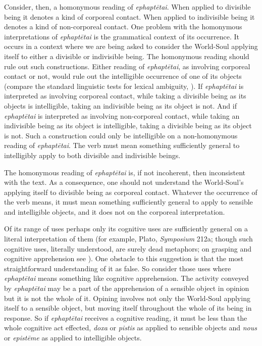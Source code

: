 Consider, then, a homonymous reading of \emph{ephaptētai}. When applied to divisible being it denotes a kind of corporeal contact. When applied to indivisible being it denotes a kind of non-corporeal contact. One problem with the homonymous interpretations of \emph{ephaptētai} is the grammatical context of its occurrence. It occurs in a context where we are being asked to consider the World-Soul applying itself to either a divisible or indivisible being. The homonymous reading should rule out such constructions. Either reading of \emph{ephaptētai}, as involving corporeal contact or not, would rule out the intelligible occurrence of one of its objects  (compare the standard linguistic tests for lexical ambiguity, \citealt{Zwicky:1975hl}). If \emph{ephaptētai} is interpreted as involving corporeal contact, while taking a divisible being as its objects is intelligible, taking an indivisible being as its object is not. And if \emph{ephaptētai} is interpreted as involving non-corporeal contact, while taking an indivisible being as its object is intelligible, taking a divisible being as its object is not. Such a construction could only be intelligible on a non-homonymous reading of \emph{ephaptētai}. The verb must mean something sufficiently general to intelligibly apply to both divisible and indivisible beings.

The homonymous reading of \emph{ephaptētai} is, if not incoherent, then inconsistent with the text. As a consequence, one should not understand the World-Soul's applying itself to divisible being as corporeal contact. Whatever the occurrence of the verb means, it must mean something sufficiently general to apply to sensible and intelligible objects, and it does not on the corporeal interpretation. 

Of its range of uses perhaps only its cognitive uses are sufficiently general on a literal interpretation of them (for example, Plato, \emph{Symposium} 212a; though such cognitive uses, literally understood, are surely dead metaphors; on grasping and cognitive apprehension see \citealt{Rosen:1961aa}). One obstacle to this suggestion is that the most straightforward understanding of it as false. So consider those uses where \emph{ephaptētai} means something like cognitive apprehension. The activity conveyed by \emph{ephaptētai} may be a part of the apprehension of a sensible object in opinion but it is not the whole of it. Opining involves not only the World-Soul applying itself to a sensible object, but moving itself throughout the whole of its being in response. So if \emph{ephaptētai} receives a cognitive reading, it must be less than the whole cognitive act effected, \emph{doxa} or \emph{pistis} as applied to sensible objects and \emph{nous} or \emph{epistēme} as applied to intelligible objects. 

